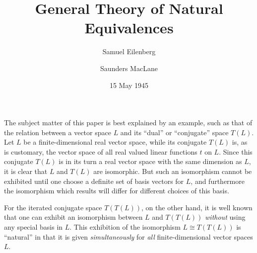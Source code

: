 \documentclass[11pt,a4paper]{report}
\date{15 May 1945}
\begin{document}
\author{Samuel Eilenberg \and Saunders MacLane}
\title{General Theory of Natural Equivalences}
\maketitle
\hypersetup{pageanchor=true}
\tableofcontents

\label{intro}

The subject matter of this paper is best explained by an example, such
as that of the relation between a vector space $L$ and its ``dual'' or
``conjugate'' space $T(L)$. Let $L$ be a finite\hyp{}dimensional real vector
space, while its conjugate $T(L)$ is, as is customary, the vector space
of all real valued linear functions $t$ on $L$. Since this conjugate $T(L)$
is in its turn a real vector space with the same dimension as $L$, it is
clear that $L$ and $T(L)$ are isomorphic. But such an isomorphism cannot
be exhibited until one choose a definite set of basis vectors for $L$,
and furthermore the isomorphism which results will differ for different
choices of this basis.

For the iterated conjugate space $T(T(L))$, on the other hand, it is well
known that one can exhibit an isomorphism between $L$ and $T(T(L))$ 
\emph{without} using any special basis in $L$. This exhibition of the
isomorphism $L\cong T(T(L))$ is ``natural'' in that it is given 
\emph{simultaneously} for \emph{all} finite\hyp{}dimensional vector spaces $L$.
\end{document}
